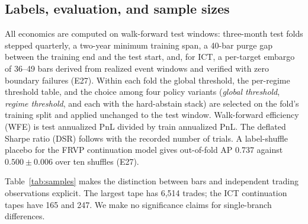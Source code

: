 \documentclass[10pt]{article}
\begin{document}
\subsection{Labels, evaluation, and sample sizes}

All economics are computed on walk-forward test windows: three-month test folds stepped quarterly, a two-year minimum training span, a 40-bar purge gap between the training end and the test start, and, for ICT, a per-target embargo of 36--49 bars derived from realized event windows and verified with zero boundary failures (E27). Within each fold the global threshold, the per-regime threshold table, and the choice among four policy variants (\emph{global threshold}, \emph{regime threshold}, and each with the hard-abstain stack) are selected on the fold's training split and applied unchanged to the test window. Walk-forward efficiency (WFE) is test annualized PnL divided by train annualized PnL. The deflated Sharpe ratio (DSR) follows \citet{bailey2014dsr} with the recorded number of trials. A label-shuffle placebo for the FRVP continuation model gives out-of-fold AP 0.737 against $0.500\pm0.006$ over ten shuffles (E27).

Table~\ref{tab:samples} makes the distinction between bars and independent trading observations explicit. The largest tape has 6,514 trades; the ICT continuation tapes have 165 and 247. We make no significance claims for single-branch differences.

\begin{table}[t]
\centering\small
\caption{Sample-size ladder for the tapes analysed. Bars are 5-minute; ``usable events'' are labelled setup events after warm-up and ambiguity exclusion; trades are walk-forward test-window trades under the selected policy. Sources: training summaries, journal E13, saved backtest summaries (E32).}
\label{tab:samples}
\end{table}
\end{document}
